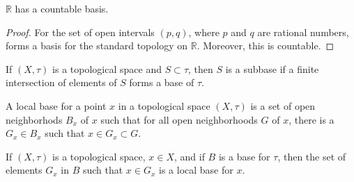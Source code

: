 \documentclass[crop=false,class=book,oneside]{standalone}
\begin{document}
        \begin{theorem}
            $\mathbb{R}$ has a countable basis.
        \end{theorem}
        \begin{proof}
            For the set of open intervals
            $(p,q)$, where $p$ and $q$ are rational
            numbers, forms a basis for the standard
            topology on $\mathbb{R}$. Moreover, this
            is countable.
        \end{proof}
        \begin{definition}
            If $(X,\tau)$ is a topological space
            and $S\subset\tau$, then $S$ is a subbase
            if a finite intersection of elements of $S$
            forms a base of $\tau$.
        \end{definition}
        \begin{definition}
            A local base for a point
            $x$ in a topological space $(X,\tau)$
            is a set of open neighborhods $B_{x}$ of
            $x$ such that for all open neighborhoods $G$
            of $x$, there is a $G_{x}\in{B_{x}}$ such that
            $x\in{G_{x}}\subset{G}$.
        \end{definition}
        \begin{theorem}
            If $(X,\tau)$ is a topological space, $x\in{X}$,
            and if $B$ is a base for $\tau$, then
            the set of elements $G_{x}$ in $B$ such that
            $x\in{G_{x}}$ is a local base for $x$.
        \end{theorem}
\end{document}
